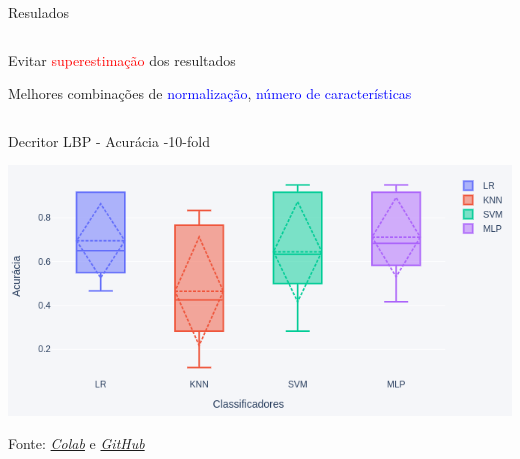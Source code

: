 \documentclass[notes,11pt, aspectratio=169]{beamer}
\newenvironment{wideitemize}{\itemize\addtolength{\itemsep}{10pt}}{\enditemize}
\begin{document}
\begin{frame}{Resulados}
\begin{columns}[T] %
	\begin{column}{.38\textwidth}
		\begin{wideitemize}
			\item Evitar \textcolor{red}{superestimação} dos resultados
			\item Melhores combinações de \textcolor{blue}{normalização}, \textcolor{blue}{número de características}
		\end{wideitemize}
	\end{column}%
	\hfill%
	\begin{column}{.58\textwidth}
	\end{column}%
\end{columns}
\end{frame}

\begin{frame}{Decritor LBP - Acurácia -10-fold}
\begin{center}
	\includegraphics[width=.8\textwidth,height=.7\textheight]{./fig/box_result_lbp.png}
\end{center}
Fonte: \emph{\textcolor{blue}{\href{https://colab.research.google.com/drive/15Ozutw22u9wfAXisgqfhmA33P3s0fbWp?usp=sharing}{Colab}}}
e
\emph{\textcolor{blue}{\href{https://github.com/guimpo/hand_on_again_ai_master/}{GitHub}}}
\end{frame}
\end{document}
